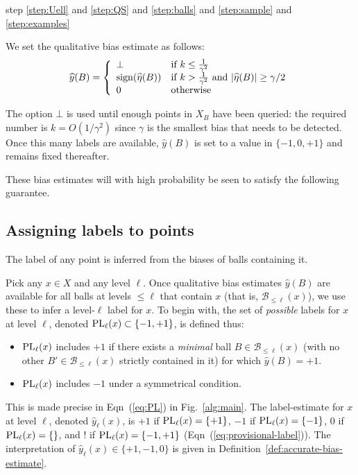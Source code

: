 \documentclass[twoside]{article}
\def\B{{\mathcal B}}
\def\yh{{\widehat{y}}}
\def\sign{{\rm sign}}
\def\PL{{\mbox{\rm PL}}}
\begin{document}
step \ref{step:Uell} and \ref{step:QS} and \ref{step:balls} and \ref{step:sample} and \ref{step:examples}

We set the qualitative bias estimate as follows:
$$ \yh(B)
= 
\left\{
  \begin{array}{ll}
    \bot & \mbox{if $k \leq \frac{1}{\gamma^2}$} \\
\sign(\widehat{\eta}(B)) & \mbox{if  $k > \frac{1}{\gamma^2}$ and $|\widehat{\eta}(B)| \geq \gamma/2$} \\
0 & \mbox{otherwise}
\end{array}
\right.
$$

The option $\bot$ is used until enough points in $X_B$ have been queried: the required number is $k = O(1/\gamma^2)$ since $\gamma$ is the smallest bias that needs to be detected. Once this many labels are available, $\yh(B)$ is set to a value in $\{-1,0,+1\}$ and remains fixed thereafter.

These bias estimates will with high probability be seen to satisfy the following guarantee.
\subsection{Assigning labels to points}

The label of any point is inferred from the biases of balls containing it. 

Pick any $x \in X$ and any level $\ell$. Once qualitative bias estimates $\yh(B)$ are available for all balls at levels $\leq \ell$ that contain $x$ (that is, $\B_{\leq \ell}(x)$), we use these to infer a level-$\ell$ label for $x$. To begin with, the set of \emph{possible} labels for $x$ at level $\ell$, denoted $\PL_\ell(x) \subset \{-1,+1\}$, is defined thus:
\begin{itemize}[leftmargin=0.5cm]
\item $\PL_\ell(x)$ includes $+1$ if there exists a \emph{minimal} ball $B \in \B_{\leq \ell}(x)$ (with no other $B' \in \B_{\leq \ell}(x)$ strictly contained in it) for which $\yh(B) = +1$.
\item $\PL_\ell(x)$ includes $-1$ under a symmetrical condition.
\end{itemize}
This is made precise in Eqn~(\ref{eq:PL}) in Fig.~\ref{alg:main}. The label-estimate for $x$ at level $\ell$, denoted $\yh_\ell(x)$, is $+1$ if $\PL_\ell(x)=\{+1\}$, $-1$ if $\PL_\ell(x) = \{-1\}$, $0$ if $\PL_\ell(x) = \{\}$, and $!$ if $\PL_\ell(x) = \{-1,+1\}$ (Eqn~(\ref{eq:provisional-label})). 
The interpretation of $\yh_\ell(x) \in \{+1,-1,0\}$ is given in Definition~\ref{def:accurate-bias-estimate}. 
\end{document}

